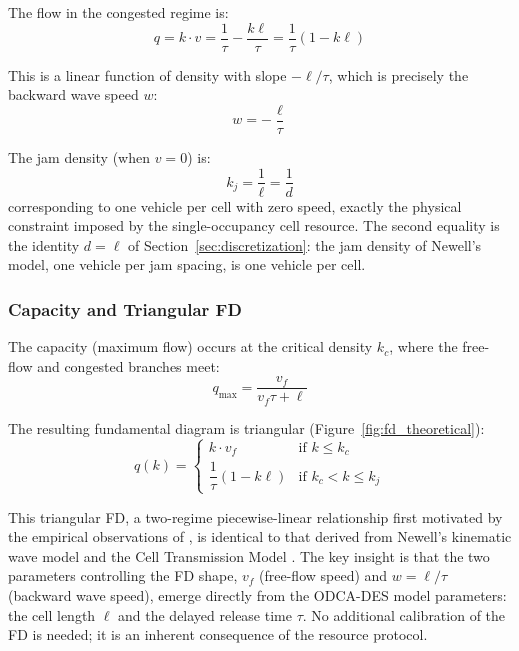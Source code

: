 \documentclass[review,number]{elsarticle}
\begin{document}
The flow in the congested regime is:
\begin{equation}
    q = k \cdot v = \frac{1}{\tau} - \frac{k\ell}{\tau} = \frac{1}{\tau}\left(1 - k\ell\right)
    \label{eq:flow_congested}
\end{equation}

This is a linear function of density with slope $-\ell/\tau$, which is precisely the backward wave speed $w$:
\begin{equation}
    w = -\frac{\ell}{\tau}
    \label{eq:wave_speed}
\end{equation}

The jam density (when $v = 0$) is:
\begin{equation}
    k_j = \frac{1}{\ell} = \frac{1}{d}
    \label{eq:jam_density}
\end{equation}
corresponding to one vehicle per cell with zero speed, exactly the physical constraint imposed by the single-occupancy cell resource. The second equality is the identity $d = \ell$ of Section~\ref{sec:discretization}: the jam density of Newell's model, one vehicle per jam spacing, is one vehicle per cell.

\subsubsection{Capacity and Triangular FD}

The capacity (maximum flow) occurs at the critical density $k_c$, where the free-flow and congested branches meet:
\begin{equation}
    q_{\max} = \frac{v_f}{v_f \tau + \ell}
    \label{eq:capacity}
\end{equation}

The resulting fundamental diagram is triangular (Figure~\ref{fig:fd_theoretical}):
\begin{equation}
    q(k) = \begin{cases}
        k \cdot v_f & \text{if } k \leq k_c \\[4pt]
        \dfrac{1}{\tau}(1 - k\ell) & \text{if } k_c < k \leq k_j
    \end{cases}
    \label{eq:triangular_fd}
\end{equation}

This triangular FD, a two-regime piecewise-linear relationship first motivated by the empirical observations of \citet{greenshields1935study}, is identical to that derived from Newell's kinematic wave model \citep{newell1993simplified} and the Cell Transmission Model \citep{daganzo1994cell}. The key insight is that the two parameters controlling the FD shape, $v_f$ (free-flow speed) and $w = \ell/\tau$ (backward wave speed), emerge directly from the ODCA-DES model parameters: the cell length $\ell$ and the delayed release time $\tau$. No additional calibration of the FD is needed; it is an inherent consequence of the resource protocol.
\end{document}
